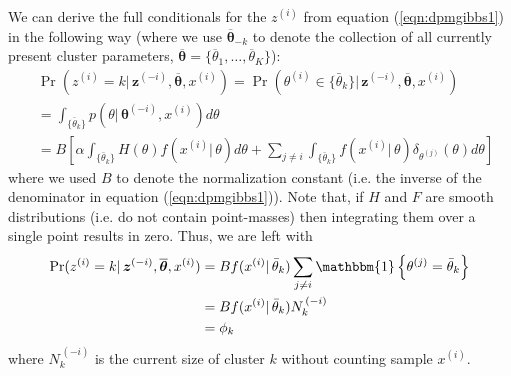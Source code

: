 \documentclass[final,3p,times,twocolumn]{elsarticle}
\let\bs\boldsymbol
\begin{document}
We can derive the full conditionals for the $z^{(i)}$ from equation (\ref{eqn:dpmgibbs1}) in the following way (where we use $\overline {\bs \theta}_{-k}$ to denote the collection of all currently present cluster parameters, $\bs{\overline\theta}=\{\overline \theta_1,\dots,\overline \theta_K\}$):
\begin{equation}
\begin{split}
&\Pr(z^{(i)}=k|\,\bs z^{(-i)},\overline {\bs \theta},x^{(i)}) = \Pr(\theta^{(i)} \in \{\bar \theta_k\}|\,\bs z^{(-i)},\overline {\bs \theta},x^{(i)})\\
&= \int_{\{\bar \theta_k\}} p(\theta|\,\bs\theta^{(-i)},x^{(i)}) d\theta\\
&= B \left[\alpha\int_{\{\bar \theta_k\}} H(\theta)f(x^{(i)}|\,\theta)d\theta + \sum_{j\neq i}\int_{\{\bar \theta_k\}}f(x^{(i)}|\,\theta)\delta_{\theta^{(j)}}(\theta)d\theta\right]
\end{split}
\end{equation}
where we used $B$ to denote the normalization constant (i.e. the inverse of the denominator in equation (\ref{eqn:dpmgibbs1})).
Note that, if $H$ and $F$ are smooth distributions (i.e. do not contain point-masses) then integrating them over a single point results in zero.
Thus, we are left with
\begin{equation}
\label{eqn:phi_k}
\begin{split}
\Pr(z^{(i)}=k|\,\bs z^{(-i)},\overline {\bs \theta},x^{(i)}) &= B f(x^{(i)}|\,\bar\theta_k)\sum_{j\neq i}\mathbbm{1}\left\{\theta^{(j)} = \bar \theta_k\right\} \\
&= B f(x^{(i)}|\,\bar\theta_k)N_k^{\,(-i)}\\
&= \phi_k
\end{split}
\end{equation}
where $N_k^{\,(-i)}$ is the current size of cluster $k$ without counting sample $x^{(i)}$.
\end{document}
